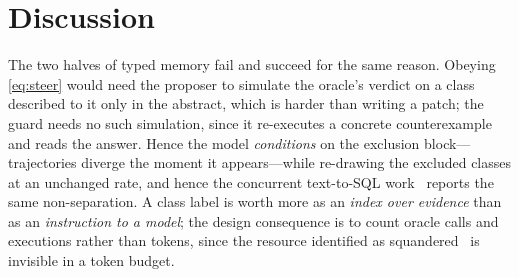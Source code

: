 \section{Discussion}
\label{sec:discussion}

The two halves of typed memory fail and succeed for the same reason. Obeying
\cref{eq:steer} would need the proposer to simulate the oracle's verdict on a
class described to it only in the abstract, which is harder than writing a
patch; the guard needs no such simulation, since it re-executes a concrete
counterexample and reads the answer. Hence the model \emph{conditions} on the
exclusion block---trajectories diverge the moment it appears---while re-drawing
the excluded classes at an unchanged rate, and hence the concurrent
text-to-SQL work~\cite{vo2026merit} reports the same non-separation. A class label is worth more as an \emph{index over evidence}
than as an \emph{instruction to a model}; the design consequence is to count
oracle calls and executions rather than tokens, since the resource identified
as squandered~\cite{lin2026run} is invisible in a token budget.
